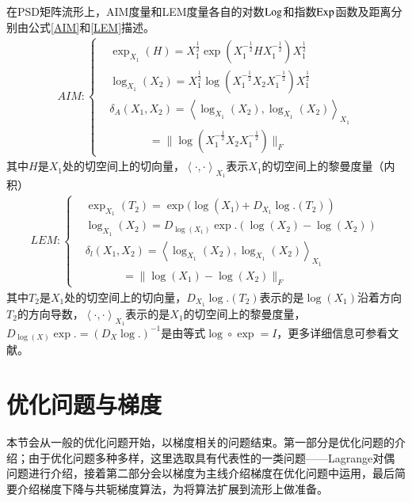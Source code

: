 在PSD矩阵流形上，AIM度量\cite{AIM_metric}和LEM度量\cite{LEM_metric}各自的对数${\rm Log}$和指数${\rm Exp}$函数及距离分别由公式\ref{AIM}和\ref{LEM}描述。
\begin{equation}
\label{AIM}
\begin{split}
AIM:\left\{
\begin{aligned}
&\exp_{X_1}(H)=X_{1}^{\frac{1}{2}}\exp(X_{1}^{-\frac{1}{2}}HX_{1}^{-\frac{1}{2}})X_{1}^{\frac{1}{2}}\\
&\log_{{X_1}}({X_2})={X_{1}^{\frac{1}{2}}}\log({X_{1}^{-\frac{1}{2}}}{X_2}{X_{1}^{-\frac{1}{2}}}){X_{1}^{\frac{1}{2}}}\\
&\delta_{A}({X_1,X_2})=\left<\log_{{X_1}}({X_2}),\log_{{X_1}}({X_2})\right>_{{X_1}}\\
&~~~~~~~~~~~~~~~~=\|\log({X_{1}^{-\frac{1}{2}}}{X_2}{X_{1}^{-\frac{1}{2}}})\|_F
\end{aligned}
\right.
\end{split}
\end{equation}
其中${H}$是${X_1}$处的切空间上的切向量，$\left<\cdot,\cdot\right>_{{X_1}}$表示$X_1$的切空间上的黎曼度量（内积）
\begin{equation}
\label{LEM}
\begin{split}
LEM:\left\{
\begin{aligned}
&\exp_{{X_1}}({T_2})=\exp(\log({X_{1})}+D_{X_1}\log.({T_2}))\\
&\log_{{X_1}}({X_2})=D_{\log({X_1})}\exp.(\log({X_2})-\log({X_2}))\\
&\delta_{l}({X_1,X_2})=\left<\log_{{X_1}}({X_2}),\log_{{X_1}}({X_2})\right>_{{X_1}}\\
&~~~~~~~~~~~~~~~=\|\log({X_{1}})-\log({X_{2}})\|_F
\end{aligned}
\right.
\end{split}
\end{equation}
其中${T_2}$是${X_1}$处的切空间上的切向量，$D_{X_1}\log.(T_2)$表示的是$\log(X_1)$沿着方向$T_2$的方向导数，$\left<\cdot,\cdot\right>_{{X_1}}$表示的是$X_1$的切空间上的黎曼度量，$D_{\log({X})}\exp.=(D_{{X}}\log.)^{-1}$是由等式$\log \circ \exp={I}$，更多详细信息可参看文献\cite{LEM_metric}。
\section{优化问题与梯度}
\label{sec:opt_and_gradient}
本节会从一般的优化问题开始，以梯度相关的问题结束。第一部分是优化问题的介绍；由于优化问题多种多样，这里选取具有代表性的一类问题——Lagrange对偶问题进行介绍，接着第二部分会以梯度为主线介绍梯度在优化问题中运用，最后简要介绍梯度下降与共轭梯度算法，为将算法扩展到流形上做准备。
